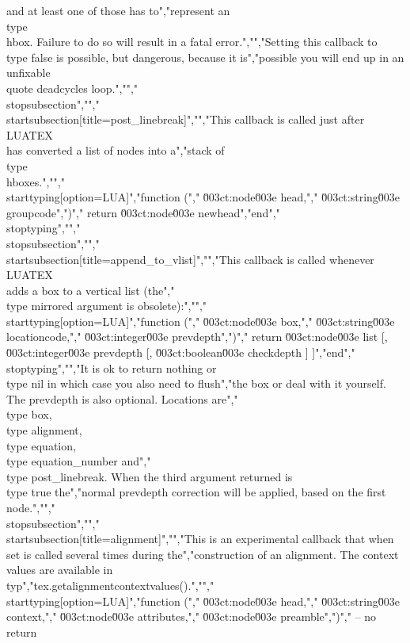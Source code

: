 and at least one of those has to","represent an \\type {\\hbox}. Failure to do so will result in a fatal error.","","Setting this callback to \\type {false} is possible, but dangerous, because it is","possible you will end up in an unfixable \\quote {deadcycles loop}.","","\\stopsubsection","","\\startsubsection[title=post_linebreak]","","This callback is called just after \\LUATEX\\ has converted a list of nodes into a","stack of \\type {\\hbox}es.","","\\starttyping[option=LUA]","function (","    \u003ct:node\u003e   head,","    \u003ct:string\u003e groupcode",")","    return \u003ct:node\u003e newhead","end","\\stoptyping","","\\stopsubsection","","\\startsubsection[title=append_to_vlist]","","This callback is called whenever \\LUATEX\\ adds a box to a vertical list (the","\\type {mirrored} argument is obsolete):","","\\starttyping[option=LUA]","function (","    \u003ct:node\u003e    box,","    \u003ct:string\u003e  locationcode,","    \u003ct:integer\u003e prevdepth",")","    return \u003ct:node\u003e list [, \u003ct:integer\u003e prevdepth [, \u003ct:boolean\u003e checkdepth ] ]","end","\\stoptyping","","It is ok to return nothing or \\type {nil} in which case you also need to flush","the box or deal with it yourself. The prevdepth is also optional. Locations are","\\type {box}, \\type {alignment}, \\type {equation}, \\type {equation_number} and","\\type {post_linebreak}. When the third argument returned is \\type {true} the","normal prevdepth correction will be applied, based on the first node.","","\\stopsubsection","","\\startsubsection[title=alignment]","","This is an experimental callback that when set is called several times during the","construction of an alignment. The context values are available in \\typ","{tex.getalignmentcontextvalues()}.","","\\starttyping[option=LUA]","function (","    \u003ct:node\u003e   head,","    \u003ct:string\u003e context,","    \u003ct:node\u003e   attributes,","    \u003ct:node\u003e   preamble",")","    -- no return 